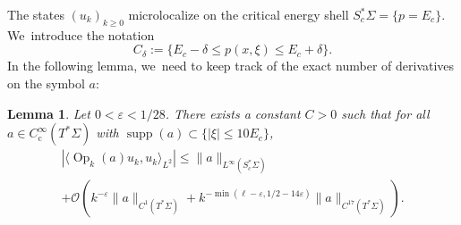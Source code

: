 \documentclass[10pt]{amsart}
\theoremstyle{plain}
\newtheorem{lemma}[theorem]{Lemma}
\theoremstyle{definition}
\let\mc\mathcal
\let\eps\varepsilon
\DeclareMathOperator{\comp}{c}
\DeclareMathOperator{\Op}{Op}
\DeclareMathOperator{\supp}{supp}
\begin{document}
The states $(u_k)_{k \geq 0}$ microlocalize on the critical energy shell $S^*_c\Sigma = \{p=E_c\}$. We~introduce the notation
\[
C_\delta := \{ E_c-\delta \leq p(x,\xi) \leq E_c + \delta\}.
\]
In the following lemma, we~need to keep track of the exact number of derivatives on the symbol $a$:

\begin{lemma}
\label{lemma:2}
Let $0 < \eps < 1/28$. There exists a constant $C > 0$ such that for all $a \in C^\infty_{\comp}(T^*\Sigma)$ with $\supp(a) \subset \{|\xi| \leq 10E_c\}$,
\begin{multline*}
|\langle\Op_k(a)u_k,u_k\rangle_{L^2}|\leq \|a\|_{L^\infty(S^*_c\Sigma)} \\
+ \mc{O}(k^{-\eps} \|a\|_{C^1(T^*\Sigma)} + k^{-\min(\ell-\eps, 1/2-14\eps)}\|a\|_{C^{17}(T^*\Sigma)}).
\end{multline*}
\end{lemma}
\end{document}
